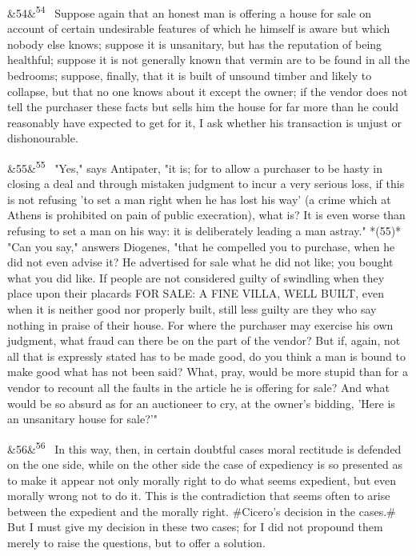 \documentclass[12pt]{article}
\newcommand{\para}[1][]{\par\noindent\ifx&#1&\else\textsuperscript{\footnotesize #1}~\fi}
\begin{document}
\para[54] Suppose again that an honest man is offering a house for sale on account of certain undesirable features of which he himself is aware but which nobody else knows; suppose it is unsanitary, but has the reputation of being healthful; suppose it is not generally known that vermin are to be found in all the bedrooms; suppose, finally, that it is built of unsound timber and likely to collapse, but that no one knows about it except the owner; if the vendor does not tell the purchaser these facts but sells him the house for far more than he could reasonably have expected to get for it, I ask whether his transaction is unjust or dishonourable.

\para[55] "Yes," says Antipater, "it is; for to allow a purchaser to be hasty in closing a deal and through mistaken judgment to incur a very serious loss, if this is not refusing 'to set a man right when he has lost his way' (a crime which at Athens is prohibited on pain of public execration), what is? It is even worse than refusing to set a man on his way: it is deliberately leading a man astray." *(55)* "Can you say," answers Diogenes, "that he compelled you to purchase, when he did not even advise it? He advertised for sale what he did not like; you bought what you did like. If people are not considered guilty of swindling when they place upon their placards FOR SALE: A FINE VILLA, WELL BUILT, even when it is neither good nor properly built, still less guilty are they who say nothing in praise of their house. For where the purchaser may exercise his own judgment, what fraud can there be on the part of the vendor? But if, again, not all that is expressly stated has to be made good, do you think a man is bound to make good what has not been said? What, pray, would be more stupid than for a vendor to recount all the faults in the article he is offering for sale? And what would be so absurd as for an auctioneer to cry, at the owner's bidding, 'Here is an unsanitary house for sale?'"

\para[56] In this way, then, in certain doubtful cases moral rectitude is defended on the one side, while on the other side the case of expediency is so presented as to make it appear not only morally right to do what seems expedient, but even morally wrong not to do it. This is the contradiction that seems often to arise between the expedient and the morally right. \#Cicero's decision in the cases.\# But I must give my decision in these two cases; for I did not propound them merely to raise the questions, but to offer a solution.
\end{document}
